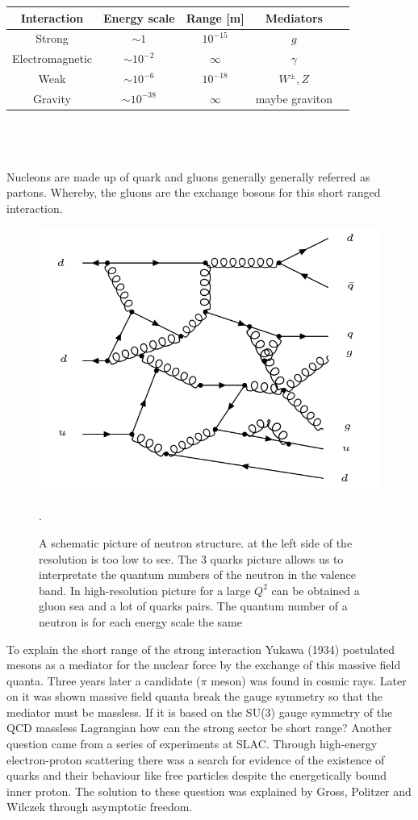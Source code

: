 \begin{tabular}{|c|c|c|c|c|}
\hline 
Interaction & Energy scale & Range [m] & Mediators \\ 
\hline 
Strong & $ \sim 1 $  & $10^{-15} $ & $g$ \\ 
\hline 
Electromagnetic & $ \sim 10^{-2} $ & $\infty$ & $\gamma $ \\ 
\hline  
Weak & $ \sim 10^{-6} $ & $10^{-18}$ & $W^{\pm}, Z$ \\ 
\hline
Gravity & $ \sim 10^{-38} $ & $\infty$ & maybe graviton \\ 
\hline 
\end{tabular}  
\\
\\
\\
Nucleons are made up of quark and gluons generally generally referred as partons. Whereby, the gluons are the exchange bosons for this short ranged interaction.
\begin{figure}[h!]
\centering
\includegraphics[scale=0.8]{images/Intro/Neutron.png}
\caption{A schematic picture of neutron structure. at the left side of the resolution is too low to see. The 3 quarks picture allows us to interpretate the quantum numbers of the neutron in the valence band.
In high-resolution picture for a large $ Q^2 $ can be obtained a gluon sea and a lot of quarks pairs\cite{Cunha13}. The quantum number of a neutron is for each energy scale the same}.
\end{figure}
To explain the short range of the strong interaction Yukawa (1934) postulated mesons as a mediator for the nuclear force by the exchange of this massive field quanta. Three years later a candidate ($ \pi $ meson) was found in cosmic rays. Later on it was shown massive field quanta break the gauge symmetry so that the mediator must be massless. If it is based on the SU(3) gauge symmetry of the QCD massless Lagrangian how can the strong sector be short range? Another question came from a series of experiments at SLAC. Through high-energy electron-proton scattering there was a search for evidence of the existence of quarks and their behaviour like free particles despite the energetically bound inner proton. The solution to these question was explained by Gross, Politzer and Wilczek through asymptotic freedom. 
